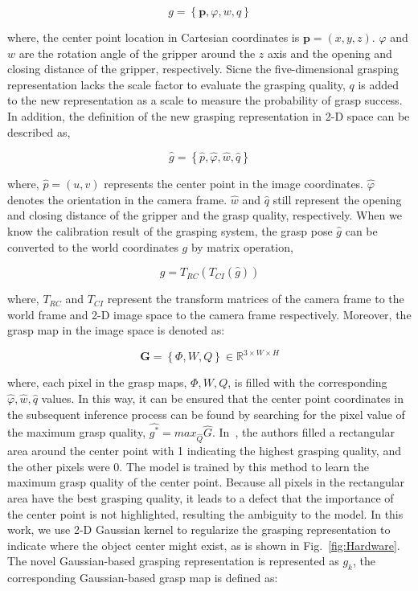 \documentclass[journal]{IEEEtran}
\begin{document}
\begin{equation}
g = \left\{\textbf{p},\varphi,w,q\right\}
\label{eq:4drepresentation}
\end{equation}

where, the center point location in Cartesian coordinates is $\textbf{p}=(x,y,z)$. $\varphi$ and $w$ are the rotation angle of the gripper around the $z$ axis and the opening and closing distance of the gripper, respectively. Sicne the five-dimensional grasping representation lacks the scale factor to evaluate the grasping quality, $q$ is added to the new representation as a scale to measure the probability of grasp success. In addition, the definition of the new grasping representation in 2-D space can be described as,

\begin{equation}
\hat{g} = \left\{\hat{p},\hat{\varphi},\hat{w},\hat{q}\right\}
\label{eq:2drepresentation}
\end{equation}

where, $\hat{p}=(u,v)$ represents the center point in the image coordinates. $\hat{\varphi}$ denotes the orientation in the camera frame. $\hat{w}$ and $\hat{q}$ still represent the opening and closing distance of the gripper and the grasp quality, respectively. When we know the calibration result of the grasping system, the grasp pose $\hat{g}$ can be converted to the world coordinates $g$ by matrix operation,

\begin{equation}
g = T_{RC}(T_{CI}(\hat{g}))
\label{eq:transform}
\end{equation}

where, $T_{RC}$ and $T_{CI}$ represent the transform matrices of the camera frame to the world frame and 2-D image space to the camera frame respectively. Moreover, the grasp map in the image space is denoted as:

\begin{equation}
\textbf{G} = \left\{\Phi,W,Q\right\}\in{\mathbb{R}^{3\times W\times H}}
\label{eq:grasp_map}
\end{equation}

where, each pixel in the grasp maps, $\Phi,W,Q$, is filled with the corresponding $\hat{\varphi},\hat{w},\hat{q}$ values. In this way, it can be ensured that the center point coordinates in the subsequent inference process can be found by searching for the pixel value of the maximum grasp quality, $\hat{g^{*}}=max_{\hat{Q}}\hat{G}$. In~\cite{ggcnn}, the authors filled a rectangular area around the center point with 1 indicating the highest grasping quality, and the other pixels were 0. The model is trained by this method to learn the maximum grasp quality of the center point. Because all pixels in the rectangular area have the best grasping quality, it leads to a defect that the importance of the center point is not highlighted, resulting the ambiguity to the model. In this work, we use 2-D Gaussian kernel to regularize the grasping representation to indicate where the object center might exist, as is shown in Fig.~\ref{fig:Hardware}. The novel Gaussian-based grasping representation is represented as $g_k$, the corresponding Gaussian-based grasp map is defined as:
\end{document}
